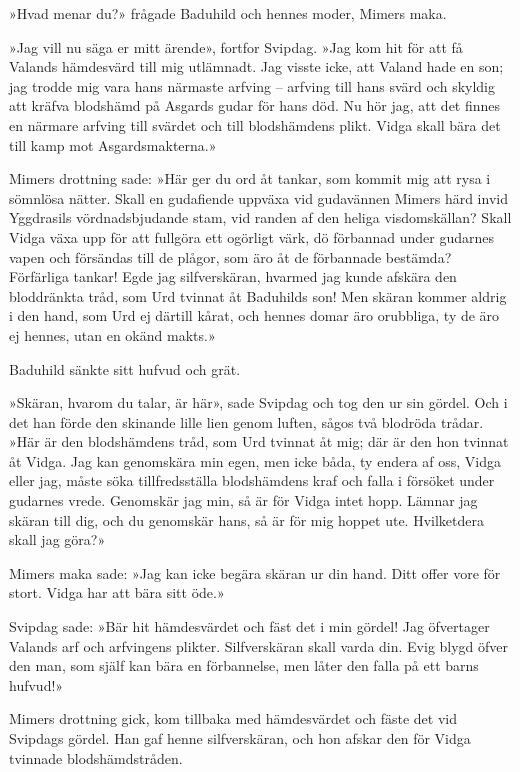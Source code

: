 »Hvad menar du?» frågade Baduhild och hennes moder, Mimers maka.

»Jag vill nu säga er mitt ärende», fortfor Svipdag. »Jag kom hit för att
få Valands hämdesvärd till mig utlämnadt. Jag visste icke, att Valand
hade en son; jag trodde mig vara hans närmaste arfving -- arfving till
hans svärd och skyldig att kräfva blodshämd på Asgards gudar för hans
död. Nu hör jag, att det finnes en närmare arfving till svärdet och till
blodshämdens plikt. Vidga skall bära det till kamp mot Asgardsmakterna.»

Mimers drottning sade: »Här ger du ord åt tankar, som kommit mig att
rysa i sömnlösa nätter. Skall en gudafiende uppväxa vid gudavännen
Mimers härd invid Yggdrasils vördnadsbjudande stam, vid randen af den
heliga visdomskällan? Skall Vidga växa upp för att fullgöra ett ogörligt
värk, dö förbannad under gudarnes vapen och försändas till de plågor,
som äro åt de förbannade bestämda? Förfärliga tankar! Egde jag
silfverskäran, hvarmed jag kunde afskära den bloddränkta tråd, som Urd
tvinnat åt Baduhilds son! Men skäran kommer aldrig i den hand, som Urd
ej därtill kårat, och hennes domar äro orubbliga, ty de äro ej hennes,
utan en okänd makts.»

Baduhild sänkte sitt hufvud och grät.

»Skäran, hvarom du talar, är här», sade Svipdag och tog den ur sin
gördel. Och i det han förde den skinande lille lien genom luften, sågos
två blodröda trådar. »Här är den blodshämdens tråd, som Urd tvinnat åt
mig; där är den hon tvinnat åt Vidga. Jag kan genomskära min egen, men
icke båda, ty endera af oss, Vidga eller jag, måste söka tillfredsställa
blodshämdens kraf och falla i försöket under gudarnes vrede. Genomskär
jag min, så är för Vidga intet hopp. Lämnar jag skäran till dig, och du
genomskär hans, så är för mig hoppet ute. Hvilketdera skall jag göra?»

Mimers maka sade: »Jag kan icke begära skäran ur din hand. Ditt offer
vore för stort. Vidga har att bära sitt öde.»

Svipdag sade: »Bär hit hämdesvärdet och fäst det i min gördel! Jag
öfvertager Valands arf och arfvingens plikter. Silfverskäran skall varda
din. Evig blygd öfver den man, som själf kan bära en förbannelse, men
låter den falla på ett barns hufvud!»

Mimers drottning gick, kom tillbaka med hämdesvärdet och fäste det vid
Svipdags gördel. Han gaf henne silfverskäran, och hon afskar den för
Vidga tvinnade blodshämdstråden.

